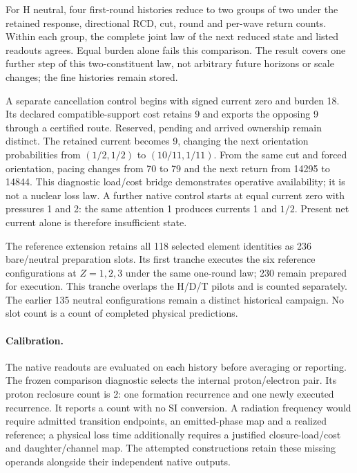 For H neutral, four first-round histories reduce to two groups of two under
the retained response, directional RCD, cut, round and per-wave return counts.
Within each group, the complete joint law of the next reduced state and listed
readouts agrees. Equal burden alone fails this comparison. The result covers
one further step of this two-constituent law, not arbitrary future horizons
or scale changes; the fine histories remain stored.

A separate cancellation control begins with signed current zero and burden
18. Its declared compatible-support cost retains 9 and exports the opposing
9 through a certified route. Reserved, pending and arrived ownership remain
distinct. The retained current becomes 9, changing the next orientation
probabilities from $(1/2,1/2)$ to $(10/11,1/11)$. From the same cut and forced
orientation, pacing changes from 70 to 79 and the next return from 14295 to
14844. This diagnostic load/cost bridge demonstrates operative availability;
it is not a nuclear loss law. A further native control starts at equal current
zero with pressures 1 and 2: the same attention 1 produces currents 1 and
$1/2$. Present net current alone is therefore insufficient state.

The reference extension retains all 118 selected element identities as 236
bare/neutral preparation slots. Its first tranche executes the six reference
configurations at $Z=1,2,3$ under the same one-round law; 230 remain prepared
for execution. This tranche overlaps the H/D/T pilots and is counted separately.
The earlier 135 neutral configurations remain a distinct historical campaign.
No slot count is a count of completed physical predictions.

\paragraph{Calibration.}
The native readouts are evaluated on each history before averaging or reporting.
The frozen comparison diagnostic selects the internal proton/electron pair. Its proton
reclosure count is 2: one formation recurrence and one newly executed recurrence.
It reports a count with no SI conversion. A radiation frequency would require
admitted transition endpoints, an emitted-phase map and a realized reference;
a physical loss time additionally requires a justified closure-load/cost and
daughter/channel map. The attempted constructions retain these missing
operands alongside their independent native outputs.

